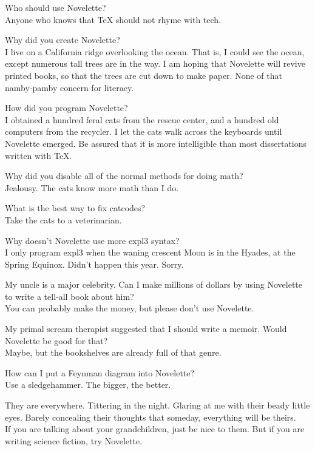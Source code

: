 \documentclass{novelette} %
\begin{document}
\begingroup\setlength\parindent{0pt}
 Who should use Novelette?\\
 Anyone who knows that TeX should not rhyme with tech.\par
{} Why did you create Novelette?\\
 I live on a California ridge overlooking the ocean. That is,
I could see the ocean, except numerous tall trees are in the way. I am hoping
that Novelette will revive printed books, so that the trees are cut down
to make paper. None of that namby-pamby concern for literacy.\par
{} How did you program Novelette?\\
 I obtained a hundred feral cats from the rescue center, and a
hundred old computers from the recycler. I let the cats walk across the
keyboards until Novelette emerged. Be assured that it is more intelligible
than most dissertations written with TeX.\par
{} Why did you disable all of the normal methods for doing math?\\
 Jealousy. The cats know more math than I do.\par
{} What is the best way to fix catcodes?\\
 Take the cats to a veterinarian.\par
{} Why doesn't Novelette use more expl3 syntax?\\
 I only program expl3 when the waning crescent Moon is in the Hyades,
at the Spring Equinox. Didn't happen this year. Sorry.\par
{} My uncle is a major celebrity. Can I make millions of dollars
by using Novelette to write a tell-all book about him?\\
 You can probably make the money, but please don't use Novelette.\par
{} My primal scream therapist suggested that I should write a memoir.
Would Novelette be good for that?\\
 Maybe, but the bookshelves are already full of that genre.\par
{} How can I put a Feynman diagram into Novelette?\\
 Use a sledgehammer. The bigger, the better.\par
{} They are everywhere. Tittering in the night. Glaring at me with
their beady little eyes. Barely concealing their thoughts that someday,
everything will be theirs. \\
 If you are talking about your grandchildren, just be nice to them.
But if you are writing science fiction, try Novelette.\par
\endgroup

\makeatletter\nocle@rtoendtrue\makeatother
\end{document}
